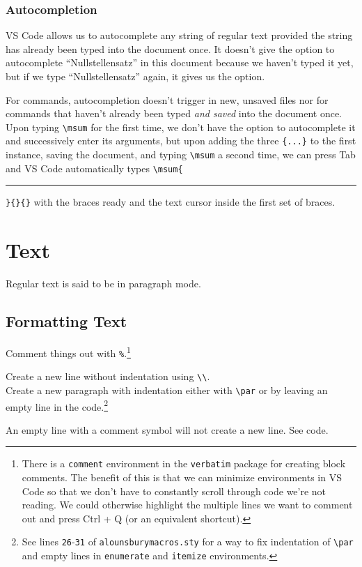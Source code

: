 \documentclass{article} 		%
\begin{document}
\subsubsection{Autocompletion} \label{subsubsec:autocompletion}
VS Code allows us to autocomplete any string of regular text provided the string has already been typed into the document once. It doesn't give the option to autocomplete ``Nullstellensatz'' in this document because we haven't typed it yet, but if we type ``Nullstellensatz'' again, it gives us the option. \par
For commands, autocompletion doesn't trigger in new, unsaved files nor for commands that haven't already been typed \textit{and saved} into the document once. Upon typing \verb$\msum$ for the first time, we don't have the option to autocomplete it and successively enter its arguments, but upon adding the three \verb${...}$ to the first instance, saving the document, and typing \verb$\msum$ a second time, we can press Tab and VS Code automatically types \verb$\msum{$\rule[-0.5ex]{1pt}{2.5ex}\verb$}{}{}$ with the braces ready and the text cursor inside the first set of braces. 

\section{Text} \label{sec:text}
Regular text is said to be in paragraph mode. 
\subsection{Formatting Text} \label{subsec:formatting-text}
Comment things out with \texttt{\%}.\footnote{
	There is a \texttt{comment} environment in the \texttt{verbatim} package for creating block comments. The benefit of this is that we can minimize environments in VS Code so that we don't have to constantly scroll through code we're not reading. We could otherwise highlight the multiple lines we want to comment out and press Ctrl + Q (or an equivalent shortcut). 
} \par
Create a new line without indentation using \verb$\\$. \\
Create a new paragraph with indentation either with \verb$\par$ or by leaving an empty line in the code.\footnote{
	See lines \texttt{26}-\texttt{31} of \texttt{alounsburymacros.sty} for a way to fix indentation of \texttt{\textbackslash par} and empty lines in \texttt{enumerate} and \texttt{itemize} environments. 
} \par
An empty line with a 
%
comment symbol will not create a new line. See code. 
\end{document}
